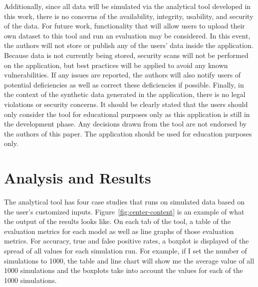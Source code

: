 \documentclass{llncs}
\begin{document}
Additionally, since all data will be simulated via the analytical tool developed in this work, there is no concerns of the availability, integrity, usability, and security of the data. For future work, functionality that will allow users to upload their own dataset to this tool and run an evaluation may be considered. In this event, the authors will not store or publish any of the users' data inside the application. Because data is not currently being stored, security scans will not be performed on the application, but best practices will be applied to avoid any known vulnerabilities. If any issues are reported, the authors will also notify users of potential deficiencies as well as correct these deficiencies if possible. Finally, in the context of the synthetic data generated in the application, there is no legal violations or security concerns. It should be clearly stated that the users should only consider the tool for educational purposes only as this application is still in the development phase. Any decisions drawn from the tool are not endorsed by the authors of this paper. The application should be used for education purposes only.  


\section{Analysis and Results}

The analytical tool has four case studies that runs on simulated data based on the user's customized inputs. Figure~\ref{fig:center-content} is an example of what the output of the results looks like.  On each tab of the tool, a table of the evaluation metrics for each model as well as line graphs of those evaluation metrics.  For accuracy, true and false positive rates, a boxplot is displayed of the spread of all values for each simulation run.  For example, if I set the number of simulations to 1000, the table and line chart will show me the average value of all 1000 simulations and the boxplots take into account the  values for each of the 1000 simulations.
\end{document}
